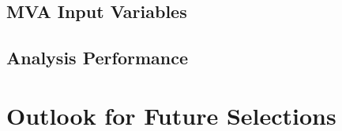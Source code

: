 \subsection{MVA Input Variables}\label{sec:FDMVAVariables}

\subsection{Analysis Performance}\label{sec:FDMVAPerformance}

\section{Outlook for Future Selections}\label{sec:FDOutlook}
